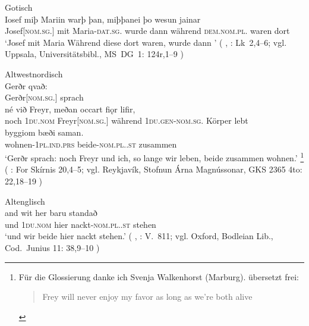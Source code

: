 \begin{exe}
\ex \label{ex:germbeide}
	\begin{xlist}
	\ex \label{ex:germbeide_1}
		\langinfo%
			{Gotisch}
			{}
			{\cite[nach][]{projectwulfila2004}}
			\\
		\gll Iosef \textelp{} miþ Mariin \textelp{} warþ þan,
				miþþanei þo wesun jainar \textelp{} \\
			Josef[\textsc{nom.sg.\MascM}] {} mit Maria-\textsc{dat.sg.\FemF} {}
				wurde dann während \textsc{dem.nom.pl.\NeutMF} waren dort {} \\
		\trans `Josef \textelp{} mit Maria \textelp{} Während diese dort
			waren, wurde dann \textelp{}'
			(%
				, : Lk~2,4--6;
				vgl. Uppsala, Universitätsbibl., MS~DG~1: 124r,1--9%
			)

	\ex \label{ex:germbeide_2}
		\langinfo%
			{Altwestnordisch}
			{}
			{\cite[nach][73]{neckelkuhn1962}}\\
		\gll Gerðr qvað: \textelp{} \\
			Gerðr[\textsc{nom.sg.\FemF}] sprach {} \\
		\gll né við Freyr, meðan occart fiǫr lifir, \\
			noch \textsc{1du\subMF.nom} Freyr[\textsc{nom.sg.\MascM}] während
				\textsc{1du.gen-nom.sg.\NeutMF} Körper lebt \\
		\gll byggiom bæði saman. \\
			wohnen-\textsc{1pl.ind.prs} beide-\textsc{nom.pl.\NeutMF.st} zusammen \\
		\trans `Gerðr sprach: \textelp{} noch Freyr und ich, so
			lange wir leben, beide zusammen wohnen.'%
			\footnote{Für die Glossierung danke ich Svenja Walkenhorst
				(Marburg). \citet[53]{terry1990} übersetzt frei:
				\foreignblockquote{english}{Frey will never
				enjoy my favor as long as we're both alive}.}
			(%
				: For Skírnis 20,4--5;
				vgl. Reykjavík, Stofnun Árna Magnússonar, GKS 2365 4to: 22,18--19%
			)

	\ex \label{ex:germbeide_3}
		\langinfo%
			{Altenglisch}
			{}
			{\cite[nach][27]{krapp1931}}\\
		\gll and wit her baru standað \\
			und \textsc{1du\subMF.nom} hier nackt-\textsc{nom.pl.\NeutMF.st}
				stehen \\
		\trans `und wir beide 
			hier nackt stehen.'
			(%
				, : V.~811;
				vgl. Oxford, Bodleian Lib., Cod.~Junius 11: 38,9--10%
			)			


\end{xlist}
\end{exe}
